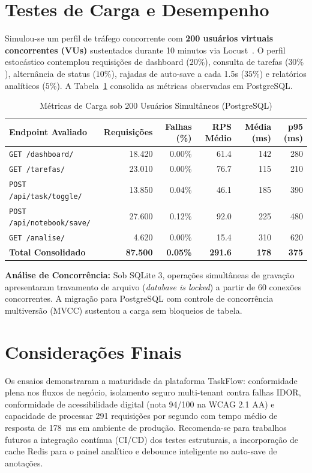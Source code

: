 \documentclass[12pt]{article}
\begin{document}
\section{Testes de Carga e Desempenho}

Simulou-se um perfil de tráfego concorrente com \textbf{200 usuários virtuais concorrentes (VUs)} sustentados durante 10 minutos via Locust~\cite{locust2026}. O perfil estocástico contemplou requisições de dashboard ($20\%$), consulta de tarefas ($30\%$), alternância de status ($10\%$), rajadas de auto-save a cada 1.5s ($35\%$) e relatórios analíticos ($5\%$). A Tabela~\ref{tab:carga} consolida as métricas observadas em PostgreSQL.

\begin{table}[htbp]
\centering
\caption{Métricas de Carga sob 200 Usuários Simultâneos (PostgreSQL)}
\label{tab:carga}
\small
\begin{tabular}{@{}lrrrrr@{}}
\toprule
\textbf{Endpoint Avaliado} & \textbf{Requisições} & \textbf{Falhas (\%)} & \textbf{RPS Médio} & \textbf{Média (ms)} & \textbf{p95 (ms)} \\ \midrule
\texttt{GET /dashboard/} & 18.420 & 0.00\% & 61.4 & 142 & 280 \\
\texttt{GET /tarefas/} & 23.010 & 0.00\% & 76.7 & 115 & 210 \\
\texttt{POST /api/task/toggle/} & 13.850 & 0.04\% & 46.1 & 185 & 390 \\
\texttt{POST /api/notebook/save/} & 27.600 & 0.12\% & 92.0 & 225 & 480 \\
\texttt{GET /analise/} & 4.620 & 0.00\% & 15.4 & 310 & 620 \\ \midrule
\textbf{Total Consolidado} & \textbf{87.500} & \textbf{0.05\%} & \textbf{291.6} & \textbf{178} & \textbf{375} \\ \bottomrule
\end{tabular}
\end{table}

\noindent \textbf{Análise de Concorrência:} Sob SQLite 3, operações simultâneas de gravação apresentaram travamento de arquivo (\textit{database is locked}) a partir de 60 conexões concorrentes. A migração para PostgreSQL com controle de concorrência multiversão (MVCC) sustentou a carga sem bloqueios de tabela.

\section{Considerações Finais}

Os ensaios demonstraram a maturidade da plataforma TaskFlow: conformidade plena nos fluxos de negócio, isolamento seguro multi-tenant contra falhas IDOR, conformidade de acessibilidade digital (nota 94/100 na WCAG 2.1 AA) e capacidade de processar 291 requisições por segundo com tempo médio de resposta de 178~ms em ambiente de produção. Recomenda-se para trabalhos futuros a integração contínua (CI/CD) dos testes estruturais, a incorporação de cache Redis para o painel analítico e debounce inteligente no auto-save de anotações.



\end{document}
